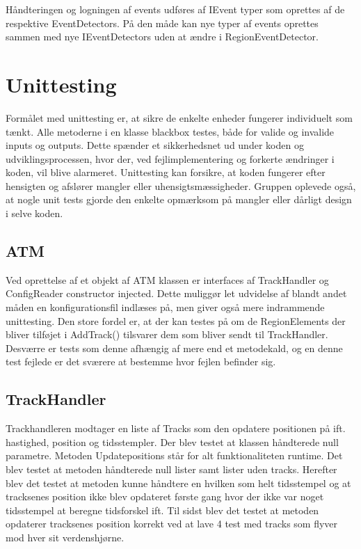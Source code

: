 Håndteringen og logningen af events udføres af IEvent typer som oprettes af de respektive EventDetectors. På den måde kan nye typer af events oprettes sammen med nye IEventDetectors uden at ændre i RegionEventDetector.

\section{Unittesting}
Formålet med unittesting er, at sikre de enkelte enheder fungerer individuelt som tænkt. Alle metoderne i en klasse blackbox testes, både for valide og invalide inputs og outputs. Dette spænder et sikkerhedsnet ud under koden og udviklingsprocessen, hvor der, ved fejlimplementering og forkerte ændringer i koden, vil blive alarmeret. Unittesting kan forsikre, at koden fungerer efter hensigten og afslører mangler eller uhensigtsmæssigheder. Gruppen oplevede også, at nogle unit tests gjorde den enkelte opmærksom på mangler eller dårligt design i selve koden.

\subsection{ATM}
Ved oprettelse af et objekt af ATM klassen er interfaces af TrackHandler og ConfigReader constructor injected. Dette muliggør let udvidelse af blandt andet måden en konfigurationsfil indlæses på, men giver også mere indrammende unittesting. Den store fordel er, at der kan testes på om de RegionElements der bliver tilføjet i AddTrack() tilsvarer dem som bliver sendt til TrackHandler. Desværre er tests som denne afhængig af mere end et metodekald, og en denne test fejlede er det sværere at bestemme hvor fejlen befinder sig.

\subsection{TrackHandler}
Trackhandleren modtager en liste af Tracks som den opdatere positionen på ift. hastighed, position og tidsstempler. Der blev testet at klassen håndterede null parametre. Metoden Updatepositions står for alt funktionaliteten runtime. Det blev testet at metoden håndterede null lister samt lister uden tracks. Herefter blev det testet at metoden kunne håndtere en hvilken som helt tidsstempel og at tracksenes position ikke blev opdateret første gang hvor der ikke var noget tidsstempel at beregne tidsforskel ift. Til sidst blev det testet at metoden opdaterer tracksenes position korrekt ved at lave 4 test med tracks som flyver mod hver sit verdenshjørne.


